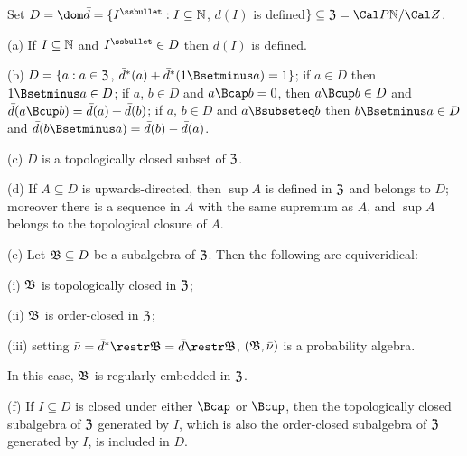  Set
$D=\dom\bar d=\{I^{\ssbullet}:I\subseteq\Bbb N$, $d(I)$ is defined$\}
\subseteq\frak Z=\Cal P\Bbb N/\Cal Z$.

(a) If $I\subseteq\Bbb N$ and $I^{\ssbullet}\in D$ then $d(I)$ is
defined.

(b) $D=\{a:a\in\frak Z$, $\bar d^*(a)+\bar d^*(1\Bsetminus a)=1\}$;
if $a\in D$ then $1\Bsetminus a\in D$;   if $a$, $b\in D$ and
$a\Bcap b=0$, then $a\Bcup b\in D$ and
$\bar d(a\Bcup b)=\bar d(a)+\bar d(b)$;
if $a$, $b\in D$ and $a\Bsubseteq b$ then
$b\Bsetminus a\in D$ and
$\bar d(b\Bsetminus a)=\bar d(b)-\bar d(a)$.

(c) $D$ is a topologically closed subset of $\frak Z$.

(d) If $A\subseteq D$ is upwards-directed, then $\sup A$ is defined in
$\frak Z$ and belongs to $D$;
moreover there is a sequence in $A$ with the same supremum
as $A$, and $\sup A$ belongs to the topological closure of $A$.

(e) Let $\frak B\subseteq D$ be a subalgebra of $\frak Z$.   Then the
following are equiveridical:

\quad (i) $\frak B$ is topologically closed in $\frak Z$;

\quad (ii) $\frak B$ is order-closed in $\frak Z$;

\quad (iii) setting $\bar\nu=\bar d^*\restr\frak B=\bar d\restr\frak B$,
$(\frak B,\bar\nu)$ is a probability algebra.

\noindent In this case, $\frak B$ is regularly embedded in $\frak Z$.

(f) If $I\subseteq D$ is closed under either $\Bcap$ or $\Bcup$, then
the topologically closed subalgebra of $\frak Z$ generated by $I$,
which is also the
order-closed subalgebra of $\frak Z$ generated by $I$, is included in
$D$.

